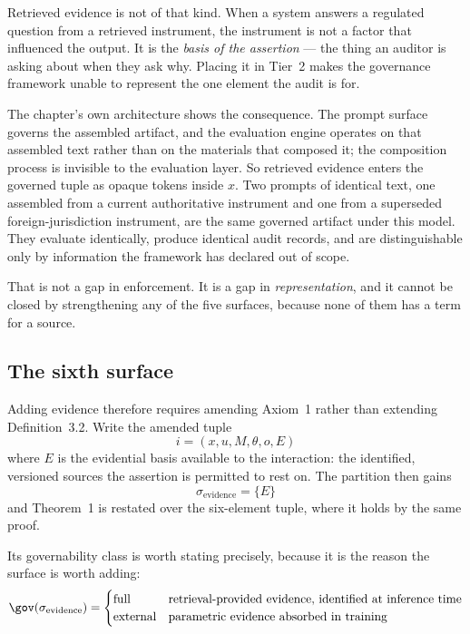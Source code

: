 Retrieved evidence is not of that kind. When a system answers a regulated question from
a retrieved instrument, the instrument is not a factor that influenced the output. It is
the \emph{basis of the assertion} --- the thing an auditor is asking about when they ask
why. Placing it in Tier~2 makes the governance framework unable to represent the one
element the audit is for.

The chapter's own architecture shows the consequence. The prompt surface governs the
assembled artifact, and the evaluation engine operates on that assembled text rather
than on the materials that composed it; the composition process is invisible to the
evaluation layer. So retrieved evidence enters the governed tuple as opaque tokens
inside $x$. Two prompts of identical text, one assembled from a current authoritative
instrument and one from a superseded foreign-jurisdiction instrument, are the same
governed artifact under this model. They evaluate identically, produce identical audit
records, and are distinguishable only by information the framework has declared out of
scope.

That is not a gap in enforcement. It is a gap in \emph{representation}, and it cannot be
closed by strengthening any of the five surfaces, because none of them has a term for a
source.

\subsection{The sixth surface}

Adding evidence therefore requires amending Axiom~1 rather than extending
Definition~3.2. Write the amended tuple
\begin{equation}
  i = (x, u, M, \theta, o, E)
  \label{eq:meta-amended-tuple}
\end{equation}
where $E$ is the evidential basis available to the interaction: the identified,
versioned sources the assertion is permitted to rest on. The partition then gains
\begin{equation}
  \sigma_{\mathrm{evidence}} = \{E\}
  \label{eq:meta-evidence-surface}
\end{equation}
and Theorem~1 is restated over the six-element tuple, where it holds by the same proof.

Its governability class is worth stating precisely, because it is the reason the surface
is worth adding:
\begin{equation}
  \gov(\sigma_{\mathrm{evidence}}) =
  \begin{cases}
    \text{full}    & \text{retrieval-provided evidence, identified at inference time}\\
    \text{external}& \text{parametric evidence absorbed in training}
  \end{cases}
  \label{eq:meta-evidence-governability}
\end{equation}

